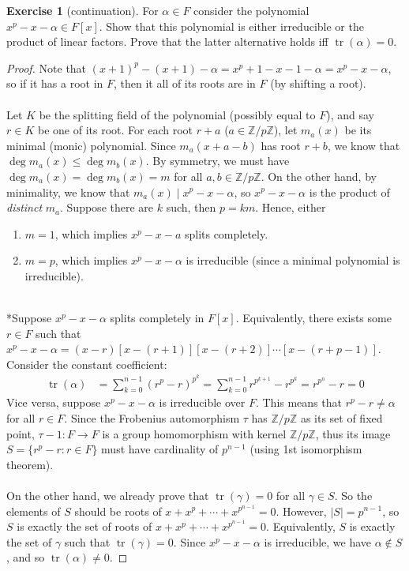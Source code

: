 \documentclass{article}
\theoremstyle{definition}
\newtheorem{exercise}{Exercise}
\begin{document}
\begin{exercise}[continuation]
For $\alpha \in F$ consider the polynomial $x^p - x - \alpha \in F[x]$. Show that this polynomial is either irreducible or the product of linear factors. Prove that the latter alternative holds iff $\operatorname{tr}(\alpha) = 0$.
\end{exercise}
\begin{proof}
Note that $(x + 1)^p - (x + 1) - \alpha = x^p + 1 - x - 1 - \alpha = x^p - x - \alpha$, so if it has a root in $F$, then it all of its roots are in $F$ (by shifting a root).
\\
\\
Let $K$ be the splitting field of the polynomial (possibly equal to $F$), and say $r \in K$ be one of its root. For each root $r + a$ ($a \in \mathbb{Z}/p\mathbb{Z}$), let $m_a (x)$ be its minimal (monic) polynomial. Since $m_a (x + a - b)$ has root $r + b$, we know that $\deg m_a (x) \leq \deg m_b (x)$. By symmetry, we must have $\deg m_a (x) = \deg m_b (x) = m$ for all $a, b \in \mathbb{Z}/p\mathbb{Z}$. On the other hand, by minimality, we know that $m_a (x) \mid x^p - x - \alpha$, so $x^p - x - \alpha$ is the product of \textit{distinct} $m_a$. Suppose there are $k$ such, then $p = km$. Hence, either
\begin{enumerate}
	\item $m = 1$, which implies $x^p - x - a$ splits completely.
	\item $m = p$, which implies $x^p - x - \alpha$ is irreducible (since a minimal polynomial is irreducible).
\end{enumerate}
\ \\
*Suppose $x^p - x - \alpha$ splits completely in $F[x]$. Equivalently, there exists some $r \in F$ such that $x^p - x - \alpha = (x - r) [x - (r + 1)] [x - (r + 2)] \cdots [x - (r + p - 1)]$. Consider the constant coefficient:
\begin{align*}
\operatorname{tr}(\alpha) & = \sum_{k = 0}^{n - 1} (r^p - r)^{p^k} = \sum_{k = 0}^{n - 1} r^{p^{k + 1}} - r^{p^k} = r^{p^n} - r = 0
\end{align*}
Vice versa, suppose $x^p - x - \alpha$ is irreducible over $F$. This means that $r^p - r \neq \alpha$ for all $r \in F$. Since the Frobenius automorphism $\tau$ has $\mathbb{Z}/p\mathbb{Z}$ as its set of fixed point, $\tau - 1: F \to F$ is a group homomorphism with kernel $\mathbb{Z}/p\mathbb{Z}$, thus its image $S = \{ r^p - r : r \in F \}$ must have cardinality of $p^{n - 1}$ (using 1st isomorphism theorem).
\\
\\
On the other hand, we already prove that $\operatorname{tr}(\gamma) = 0$ for all $\gamma \in S$. So the elements of $S$ should be roots of $x + x^p + \cdots + x^{p^{n - 1}} = 0$. However, $|S| = p^{n - 1}$, so $S$ is exactly the set of roots of $x + x^p + \cdots + x^{p^{n - 1}} = 0$. Equivalently, $S$ is exactly the set of $\gamma$ such that $\operatorname{tr}(\gamma) = 0$. Since $x^p - x - \alpha$ is irreducible, we have $\alpha \notin S$, and so $\operatorname{tr}(\alpha) \neq 0$.
\end{proof}
\end{document}
